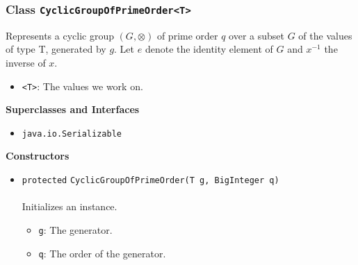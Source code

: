 \subsubsection{Class \lstinline|CyclicGroupOfPrimeOrder<T>|}
Represents a cyclic group $(G, \otimes)$ of prime order $q$ over a subset
 $G$ of the values of type T, generated by $g$.
 Let $e$ denote the identity element of $G$ and $x^{-1}$ the inverse of $x$. \\
\noindent\begin{minipage}[t]{5cm}
\vspace{0.3em}
\hspace*{2em}
\vspace{0.3em}
\end{minipage}

\begin{itemize}
\item \lstinline|<T>|: The values we work on.
\end{itemize}


\textbf{\sffamily Superclasses and Interfaces}
\begin{itemize}
\item \lstinline|java.io.Serializable|
\end{itemize}


\textbf{\sffamily Constructors}
\begin{itemize}
\item \lstinline|protected| \lstinline|CyclicGroupOfPrimeOrder|\lstinline|(T g, BigInteger q)|\\ \\[-0.6em]
Initializes an instance.
\begin{itemize}
\item \lstinline|g|: The generator.
\item \lstinline|q|: The order of the generator.
\end{itemize}



\end{itemize}


